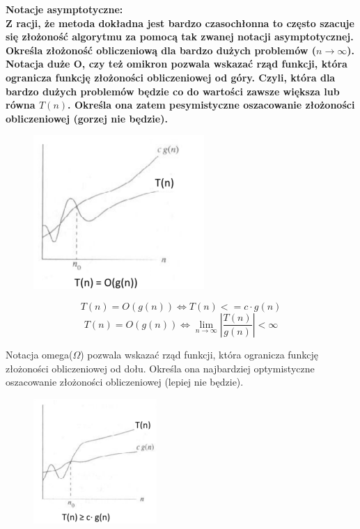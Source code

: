\documentclass[a4paper,12pt]{article}
\newcommand{\h}[1]{\noindent \bf #1 \rm \\ \noindent}
\begin{document}
\newpage
\h{Notacje asymptotyczne:}
Z racji, że metoda dokładna jest bardzo czasochłonna to często szacuje się złożoność algorytmu za pomocą tak zwanej notacji asymptotycznej. Określa złożoność obliczeniową dla bardzo dużych problemów ($n \rightarrow \infty$).\\

\noindent
Notacja duże O, czy też omikron pozwala wskazać rząd funkcji, która ogranicza funkcję złożoności obliczeniowej od góry. Czyli, która dla bardzo dużych problemów będzie co do wartości zawsze większa lub równa $T(n)$. Określa ona zatem pesymistyczne oszacowanie złożoności obliczeniowej (gorzej nie będzie).\\

\begin{figure}[H]
	\centering
	\includegraphics{omikron.png}
\end{figure}

\begin{equation}
	T(n) = O(g(n)) \iff T(n) <= c \cdot g(n)
\end{equation}
\begin{equation}
	T(n) = O(g(n)) \iff \lim\limits_{n \rightarrow \infty}|\frac{T(n)}{g(n)}| < \infty
\end{equation}

\noindent
Notacja omega($\Omega$) pozwala wskazać rząd funkcji, która ogranicza funkcję złożoności obliczeniowej od dołu. Określa ona najbardziej optymistyczne oszacowanie złożoności obliczeniowej (lepiej nie będzie).\\

\begin{figure}[H]
	\centering
	\includegraphics{omega.png}
\end{figure}
\end{document}
